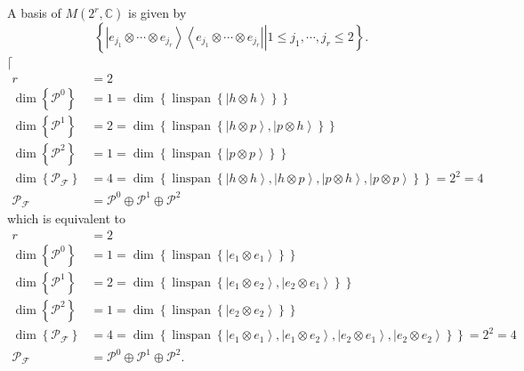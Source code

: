 \documentclass[aps,preprint]{revtex4}%
\begin{document}
A basis of $M\left(  2^{r},\mathbb{C}\right)  $ is given by
\begin{equation}
\left\{  \left.  \left\vert e_{j_{1}}\otimes\cdots\otimes e_{j_{r}%
}\right\rangle \left\langle e_{j_{1}}\otimes\cdots\otimes e_{j_{r}}\right\vert
\right\vert 1\leq j_{1},\cdots,j_{r}\leq2\right\}  .
\end{equation}
$\lceil$%
\begin{align}
r  &  =2\\
\dim\left\{  \mathcal{P}^{0}\right\}   &  =1=\dim\left\{
\operatorname*{linspan}\left\{  \left\vert h\otimes h\right\rangle \right\}
\right\} \\
\dim\left\{  \mathcal{P}^{1}\right\}   &  =2=\dim\left\{
\operatorname*{linspan}\left\{  \left\vert h\otimes p\right\rangle ,\left\vert
p\otimes h\right\rangle \right\}  \right\} \\
\dim\left\{  \mathcal{P}^{2}\right\}   &  =1=\dim\left\{
\operatorname*{linspan}\left\{  \left\vert p\otimes p\right\rangle \right\}
\right\} \\
\dim\left\{  \mathcal{P}_{\mathcal{F}}\right\}   &  =4=\dim\left\{
\operatorname*{linspan}\left\{  \left\vert h\otimes h\right\rangle ,\left\vert
h\otimes p\right\rangle ,\left\vert p\otimes h\right\rangle ,\left\vert
p\otimes p\right\rangle \right\}  \right\}  =2^{2}=4\\
\mathcal{P}_{\mathcal{F}}  &  =\mathcal{P}^{0}\oplus\mathcal{P}^{1}%
\oplus\mathcal{P}^{2}%
\end{align}
which is equivalent to
\begin{align}
r  &  =2\\
\dim\left\{  \mathcal{P}^{0}\right\}   &  =1=\dim\left\{
\operatorname*{linspan}\left\{  \left\vert e_{1}\otimes e_{1}\right\rangle
\right\}  \right\} \\
\dim\left\{  \mathcal{P}^{1}\right\}   &  =2=\dim\left\{
\operatorname*{linspan}\left\{  \left\vert e_{1}\otimes e_{2}\right\rangle
,\left\vert e_{2}\otimes e_{1}\right\rangle \right\}  \right\} \\
\dim\left\{  \mathcal{P}^{2}\right\}   &  =1=\dim\left\{
\operatorname*{linspan}\left\{  \left\vert e_{2}\otimes e_{2}\right\rangle
\right\}  \right\} \\
\dim\left\{  \mathcal{P}_{\mathcal{F}}\right\}   &  =4=\dim\left\{
\operatorname*{linspan}\left\{  \left\vert e_{1}\otimes e_{1}\right\rangle
,\left\vert e_{1}\otimes e_{2}\right\rangle ,\left\vert e_{2}\otimes
e_{1}\right\rangle ,\left\vert e_{2}\otimes e_{2}\right\rangle \right\}
\right\}  =2^{2}=4\\
\mathcal{P}_{\mathcal{F}}  &  =\mathcal{P}^{0}\oplus\mathcal{P}^{1}%
\oplus\mathcal{P}^{2}.
\end{align}
\end{document}
